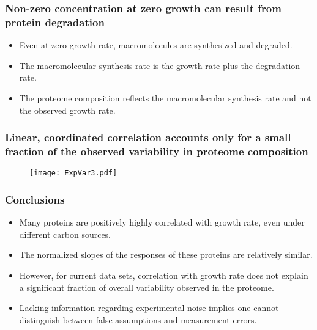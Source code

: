 \documentclass{beamer}
\begin{document}
\begin{frame}
\frametitle{Non-zero concentration at zero growth can result from protein degradation}
\begin{itemize}
\item Even at zero growth rate, macromolecules are synthesized and degraded.
\item The macromolecular synthesis rate is the growth rate plus the degradation rate.
\item The proteome composition reflects the macromolecular synthesis rate and not the observed growth rate.
\end{itemize}
\end{frame}

\begin{frame}
\frametitle{Linear, coordinated correlation accounts only for a small fraction of the observed variability in proteome composition}
\begin{figure}[h!]
\centering
\texttt{[image: ExpVar3.pdf]}
\end{figure}
\end{frame}
\begin{frame}
\frametitle{Conclusions}
\begin{itemize}
\item Many proteins are positively highly correlated with growth rate, even under different carbon sources.
\item The normalized slopes of the responses of these proteins are relatively similar.
\item However, for current data sets, correlation with growth rate does not explain a significant fraction of overall variability observed in the proteome.
\item Lacking information regarding experimental noise implies one cannot distinguish between false assumptions and measurement errors.
\end{itemize}
\end{frame}
\end{document}
